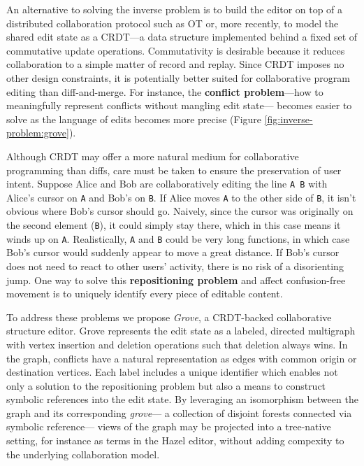 An alternative to solving the inverse problem is to build the editor on top of a distributed collaboration protocol such as OT or,
more recently, to model the shared edit state as a CRDT---a data structure implemented behind a fixed set of commutative update operations.
Commutativity is desirable because it reduces collaboration to a simple matter of record and replay.
Since CRDT imposes no other design constraints, it is potentially better suited for collaborative program editing than diff-and-merge.
For instance, the \textbf{conflict problem}---how to meaningfully represent conflicts without mangling edit state---%
becomes easier to solve as the language of edits becomes more precise (Figure \ref{fig:inverse-problem:grove}).

Although CRDT may offer a more natural medium for collaborative programming than diffs,
care must be taken to ensure the preservation of user intent.
Suppose Alice and Bob are collaboratively editing the line \verb|A B| with Alice's cursor on \verb|A| and Bob's on \verb|B|.
If Alice moves \verb|A| to the other side of \verb|B|, it isn't obvious where Bob's cursor should go.
Naively, since the cursor was originally on the second element (\verb|B|), it could simply stay there,
which in this case means it winds up on \verb|A|.
Realistically, \verb|A| and \verb|B| could be very long functions, in which case Bob's cursor would suddenly appear to move a great distance.
If Bob's cursor does not need to react to other users' activity, there is no risk of a disorienting jump.
One way to solve this \textbf{repositioning problem} and affect confusion-free movement is to uniquely identify every piece of editable content.

To address these problems we propose \emph{Grove}, a CRDT-backed collaborative structure editor.
Grove represents the edit state as a labeled, directed multigraph with vertex insertion and deletion operations such that deletion always wins.
In the graph, conflicts have a natural representation as edges with common origin or destination vertices.
Each label includes a unique identifier which enables not only a solution to the repositioning problem
but also a means to construct symbolic references into the edit state.
By leveraging an isomorphism between the graph and its corresponding \emph{grove}---%
a collection of disjoint forests connected via symbolic reference---%
views of the graph may be projected into a tree-native setting, for instance as terms in the Hazel editor,
without adding compexity to the underlying collaboration model.

